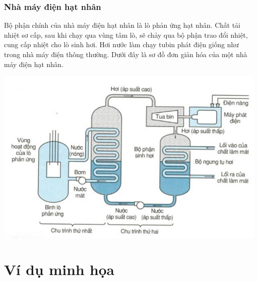 \subsubsection{Nhà máy điện hạt nhân}
Bộ phận chính của nhà máy điện hạt nhân là lò phản ứng hạt nhân. Chất tải nhiệt sơ cấp, sau khi chạy qua vùng tâm lò, sẽ chảy qua bộ phận trao đổi nhiệt, cung cấp nhiệt cho lò sinh hơi. Hơi nước làm chạy tubin phát điện giống như trong nhà máy điện thông thường. Dưới đây là sơ đồ đơn giản hóa của một nhà máy điện hạt nhân.
\begin{center}
	\includegraphics[scale=0.8]{../figs/VN12-PH-49-A-027-1-H1.jpg}
\end{center}

\section{Ví dụ minh họa}



